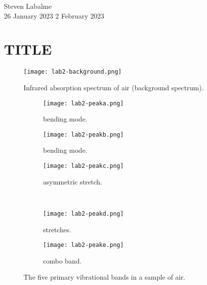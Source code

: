 \documentclass[../labs.tex]{subfiles}
\begin{document}
\noindent Steven Labalme\\
26 January 2023\hfill
2 February 2023

\section{TITLE}
\begin{figure}[H]
    \centering
    \texttt{[image: lab2-background.png]}
    \caption{Infrared absorption spectrum of air (background spectrum).}
    \label{fig:background}
\end{figure}

\begin{figure}[H]
    \centering
    \begin{subfigure}[b]{0.32\linewidth}
        \centering
        \texttt{[image: lab2-peaka.png]}
        \caption{ bending mode.}
        \label{fig:peaka}
    \end{subfigure}
    \begin{subfigure}[b]{0.32\linewidth}
        \centering
        \texttt{[image: lab2-peakb.png]}
        \caption{ bending mode.}
        \label{fig:peakb}
    \end{subfigure}
    \begin{subfigure}[b]{0.32\linewidth}
        \centering
        \texttt{[image: lab2-peakc.png]}
        \caption{ asymmetric stretch.}
        \label{fig:peakc}
    \end{subfigure}\\[1em]
    \begin{subfigure}[b]{0.32\linewidth}
        \centering
        \texttt{[image: lab2-peakd.png]}
        \caption{ stretches.}
        \label{fig:peakd}
    \end{subfigure}
    \begin{subfigure}[b]{0.32\linewidth}
        \centering
        \texttt{[image: lab2-peake.png]}
        \caption{ combo band.}
        \label{fig:peake}
    \end{subfigure}
    \caption{The five primary vibrational bands in a sample of air.}
    \label{fig:peak}
\end{figure}
\end{document}

